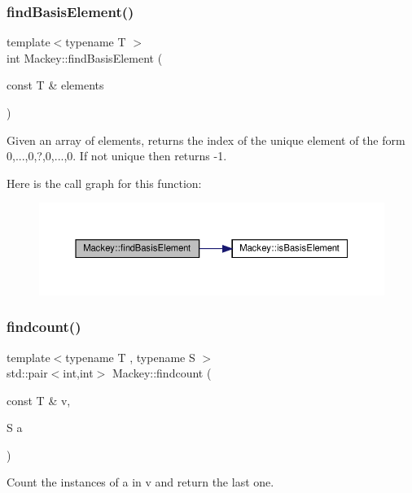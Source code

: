 \subsubsection{\texorpdfstring{find\+Basis\+Element()}{findBasisElement()}}
{\footnotesize\ttfamily template$<$typename T $>$ \\
int Mackey\+::find\+Basis\+Element (\begin{DoxyParamCaption}\item[{const T \&}]{elements }\end{DoxyParamCaption})}



Given an array of elements, returns the index of the unique element of the form 0,...,0,?,0,...,0. If not unique then returns -\/1. 

Here is the call graph for this function\+:\nopagebreak
\begin{figure}[H]
\begin{center}
\leavevmode
\includegraphics[width=350pt]{namespaceMackey_ab5bc349f95c14d448e42622de2d6a448_cgraph}
\end{center}
\end{figure}
\mbox{\label{namespaceMackey_a1a7a26880f8c7c087503e2bc16168d3c}} 
\subsubsection{\texorpdfstring{findcount()}{findcount()}}
{\footnotesize\ttfamily template$<$typename T , typename S $>$ \\
std\+::pair$<$int,int$>$ Mackey\+::findcount (\begin{DoxyParamCaption}\item[{const T \&}]{v,  }\item[{S}]{a }\end{DoxyParamCaption})}



Count the instances of a in v and return the last one. 

\mbox{\label{namespaceMackey_a2b9319a9af0a3cad8cfec47e9197dc82}} 
